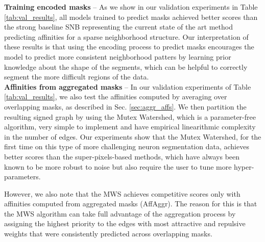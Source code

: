 \textbf{Training encoded masks} -- As we show in our validation experiments in Table \ref{tab:val_results}, all models trained to predict \maskname masks achieved better scores than the strong baseline SNB representing the current state of the art method predicting affinities for a sparse neighborhood structure. 
Our interpretation of these results is that using the encoding process to predict \maskname masks encourages the model to predict more consistent neighborhood patters by learning prior knowledge about the shape of the segments, which can be helpful to correctly segment the more difficult regions of the data. \\

\textbf{Affinities from aggregated masks}  -- 
In our validation experiments of Table \ref{tab:val_results}, we also test the affinities computed by averaging over overlapping masks, as described in Sec. \ref{sec:aggr_affs}. We then partition the resulting signed graph by using the Mutex Watershed, which is a parameter-free algorithm, very simple to implement and have empirical linearithmic complexity in the number of edges. 
Our experiments show that the Mutex Watershed, for the first time on this type of more challenging neuron segmentation data, achieves better scores than the super-pixels-based methods, which have always been known to be more robust to noise but also require the user to tune more hyper-parameters.   

However, we also note that the MWS achieves competitive scores only with affinities computed from aggregated masks (AffAggr).
The reason for this is that the MWS algorithm can take full advantage of the \maskname aggregation process by assigning the highest priority to the edges with most attractive and repulsive weights that were consistently predicted across overlapping masks.

